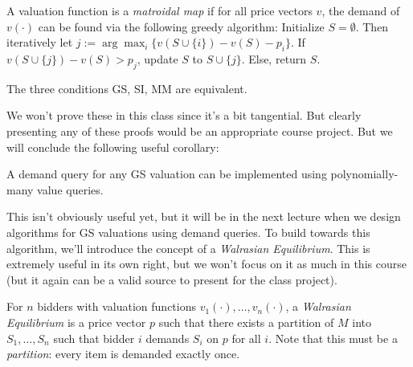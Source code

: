 \begin{definition} A valuation function is a \emph{matroidal map} if for all price vectors $v$, the demand of $v(\cdot)$ can be found via the following greedy algorithm: Initialize $S = \emptyset$. Then iteratively let $j:= \arg\max_{i}\{v(S \cup \{i\})-v(S)-p_i\}$. If $v(S \cup \{j\}) - v(S) > p_j$, update $S$ to $S \cup \{j\}$. Else, return $S$.

\end{definition}

\begin{theorem} The three conditions GS, SI, MM are equivalent.
\end{theorem}
We won't prove these in this class since it's a bit tangential. But clearly presenting any of these proofs would be an appropriate course project. But we will conclude the following useful corollary:

\begin{corollary}A demand query for any GS valuation can be implemented using polynomially-many value queries.
\end{corollary}

This isn't obviously useful yet, but it will be in the next lecture when we design algorithms for GS valuations using demand queries. To build towards this algorithm, we'll introduce the concept of a \emph{Walrasian Equilibrium}. This is extremely useful in its own right, but we won't focus on it as much in this course (but it again can be a valid source to present for the class project).

\begin{definition} For $n$ bidders with valuation functions $v_1(\cdot),\ldots, v_n(\cdot)$, a \emph{Walrasian Equilibrium} is a price vector $p$ such that there exists a partition of $M$ into $S_1,\ldots, S_n$ such that bidder $i$ demands $S_i$ on $p$ for all $i$. Note that this must be a \emph{partition}: every item is demanded exactly once.
\end{definition}

